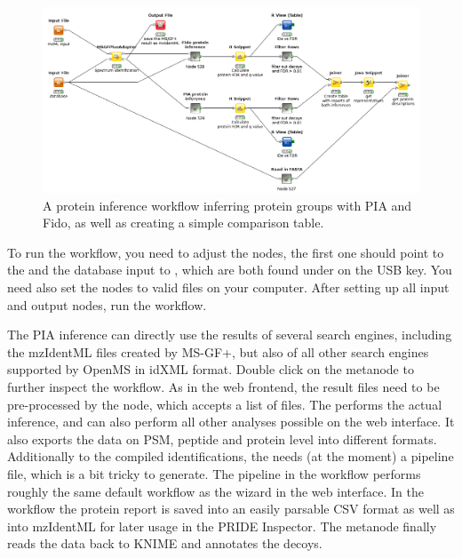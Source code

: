 \begin{figure}
\centering
\includegraphics[width=\textwidth]{graphics/protein_inference/inference_workflow}
\caption{A protein inference workflow inferring protein groups with PIA and Fido, as well as creating a simple comparison table.}
\label{fig:pia_and_fido_comparison_workflow}
\end{figure}

To run the workflow, you need to adjust the  nodes, the first one should point to the  and the database input to \newline{}, which are both found under  on the USB key. You need also set the  nodes to valid files on your computer. After setting up all input and output nodes, run the workflow.

The PIA inference can directly use the results of several search engines, including the mzIdentML files created by MS-GF+, but also of all other search engines supported by OpenMS in idXML format. Double click on the  metanode to further inspect the workflow. As in the web frontend, the result files need to be pre-processed by the  node, which accepts a list of files. The  performs the actual inference, and can also perform all other analyses possible on the web interface. It also exports the data on PSM, peptide and protein level into different formats. Additionally to the compiled identifications, the  needs (at the moment) a pipeline file, which is a bit tricky to generate. The pipeline in the workflow performs roughly the same default workflow as the wizard in the web interface. In the workflow the protein report is saved into an easily parsable CSV format as well as into mzIdentML for later usage in the PRIDE Inspector. The  metanode finally reads the data back to KNIME and annotates the decoys.

